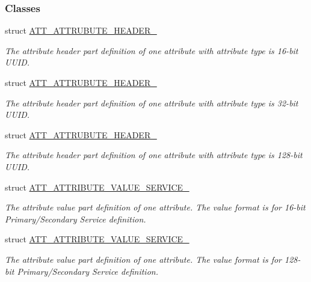 \subsubsection*{Classes}
\begin{DoxyCompactItemize}
\item 
struct \hyperlink{struct_a_t_t___a_t_t_r_u_b_u_t_e___h_e_a_d_e_r__2}{A\+T\+T\+\_\+\+A\+T\+T\+R\+U\+B\+U\+T\+E\+\_\+\+H\+E\+A\+D\+E\+R\+\_}
\begin{DoxyCompactList}\small\item\em The attribute header part definition of one attribute with attribute type is 16-\/bit U\+U\+ID. \end{DoxyCompactList}\item 
struct \hyperlink{struct_a_t_t___a_t_t_r_u_b_u_t_e___h_e_a_d_e_r__4}{A\+T\+T\+\_\+\+A\+T\+T\+R\+U\+B\+U\+T\+E\+\_\+\+H\+E\+A\+D\+E\+R\+\_}
\begin{DoxyCompactList}\small\item\em The attribute header part definition of one attribute with attribute type is 32-\/bit U\+U\+ID. \end{DoxyCompactList}\item 
struct \hyperlink{struct_a_t_t___a_t_t_r_u_b_u_t_e___h_e_a_d_e_r__16}{A\+T\+T\+\_\+\+A\+T\+T\+R\+U\+B\+U\+T\+E\+\_\+\+H\+E\+A\+D\+E\+R\+\_}
\begin{DoxyCompactList}\small\item\em The attribute header part definition of one attribute with attribute type is 128-\/bit U\+U\+ID. \end{DoxyCompactList}\item 
struct \hyperlink{struct_a_t_t___a_t_t_r_i_b_u_t_e___v_a_l_u_e___s_e_r_v_i_c_e__2}{A\+T\+T\+\_\+\+A\+T\+T\+R\+I\+B\+U\+T\+E\+\_\+\+V\+A\+L\+U\+E\+\_\+\+S\+E\+R\+V\+I\+C\+E\+\_}
\begin{DoxyCompactList}\small\item\em The attribute value part definition of one attribute. The value format is for 16-\/bit Primary/\+Secondary Service definition. \end{DoxyCompactList}\item 
struct \hyperlink{struct_a_t_t___a_t_t_r_i_b_u_t_e___v_a_l_u_e___s_e_r_v_i_c_e__16}{A\+T\+T\+\_\+\+A\+T\+T\+R\+I\+B\+U\+T\+E\+\_\+\+V\+A\+L\+U\+E\+\_\+\+S\+E\+R\+V\+I\+C\+E\+\_}
\begin{DoxyCompactList}\small\item\em The attribute value part definition of one attribute. The value format is for 128-\/bit Primary/\+Secondary Service definition. \end{DoxyCompactList}\item 

\end{DoxyCompactItemize}
